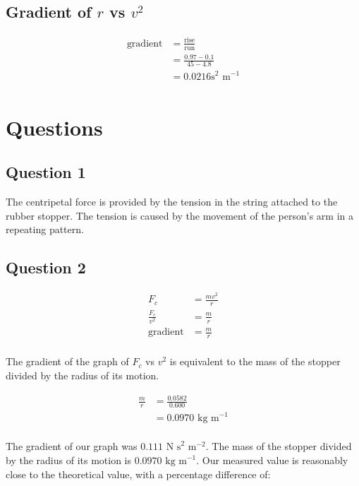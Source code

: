 \documentclass[a4paper,11pt]{article}
\begin{document}
\subsection{Gradient of $r$ vs $v^2$}

\begin{align*}
	\mbox{gradient} & = \frac{\mbox{rise}}{\mbox{run}} \\
					& = \frac{0.97 - 0.1}{45 - 4.8} \\
					& = 0.0216\mbox{s}^{2}\mbox{ m}^{-1} \\
\end{align*}


\section{Questions}

\subsection{Question 1}

The centripetal force is provided by the tension in the string attached to the
rubber stopper. The tension is caused by the movement of the person's arm in a
repeating pattern.


\subsection{Question 2}

\begin{align*}
				F_c & = \frac{mv^2}{r} \\
	\frac{F_c}{v^2} & = \frac{m}{r} \\
	\mbox{gradient} & = \frac{m}{r} \\
\end{align*}

The gradient of the graph of $F_c$ vs $v^2$ is equivalent to the mass of the
stopper divided by the radius of its motion.

\begin{align*}
	\frac{m}{r} & = \frac{0.0582}{0.600} \\
				& = 0.0970\mbox{ kg m}^{-1} \\
\end{align*}

The gradient of our graph was $0.111\mbox{ N s}^{2}\mbox{ m}^{-2}$. The mass of
the stopper divided by the radius of its motion is $0.0970\mbox{ kg m}^{-1}$.
Our measured value is reasonably close to the theoretical value, with a
percentage difference of:
\end{document}
